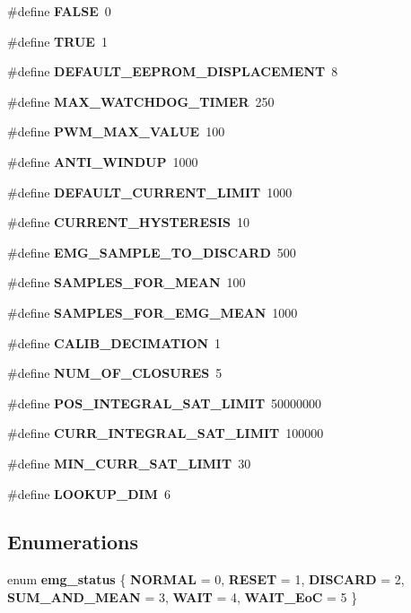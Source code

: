 \begin{DoxyCompactItemize}
\item 
\mbox{\label{globals_8h_aa93f0eb578d23995850d61f7d61c55c1}} 
\#define {\bfseries F\+A\+L\+SE}~0
\item 
\mbox{\label{globals_8h_aa8cecfc5c5c054d2875c03e77b7be15d}} 
\#define {\bfseries T\+R\+UE}~1
\item 
\#define \textbf{ D\+E\+F\+A\+U\+L\+T\+\_\+\+E\+E\+P\+R\+O\+M\+\_\+\+D\+I\+S\+P\+L\+A\+C\+E\+M\+E\+NT}~8
\item 
\#define \textbf{ M\+A\+X\+\_\+\+W\+A\+T\+C\+H\+D\+O\+G\+\_\+\+T\+I\+M\+ER}~250
\item 
\#define \textbf{ P\+W\+M\+\_\+\+M\+A\+X\+\_\+\+V\+A\+L\+UE}~100
\item 
\#define \textbf{ A\+N\+T\+I\+\_\+\+W\+I\+N\+D\+UP}~1000
\item 
\#define \textbf{ D\+E\+F\+A\+U\+L\+T\+\_\+\+C\+U\+R\+R\+E\+N\+T\+\_\+\+L\+I\+M\+IT}~1000
\item 
\#define \textbf{ C\+U\+R\+R\+E\+N\+T\+\_\+\+H\+Y\+S\+T\+E\+R\+E\+S\+IS}~10
\item 
\#define \textbf{ E\+M\+G\+\_\+\+S\+A\+M\+P\+L\+E\+\_\+\+T\+O\+\_\+\+D\+I\+S\+C\+A\+RD}~500
\item 
\#define \textbf{ S\+A\+M\+P\+L\+E\+S\+\_\+\+F\+O\+R\+\_\+\+M\+E\+AN}~100
\item 
\#define \textbf{ S\+A\+M\+P\+L\+E\+S\+\_\+\+F\+O\+R\+\_\+\+E\+M\+G\+\_\+\+M\+E\+AN}~1000
\item 
\mbox{\label{globals_8h_a373fe6bcff3bcd2f3c47359f9e640bf5}} 
\#define {\bfseries C\+A\+L\+I\+B\+\_\+\+D\+E\+C\+I\+M\+A\+T\+I\+ON}~1
\item 
\mbox{\label{globals_8h_a3132fbe7ff2f1850f96481fca447326a}} 
\#define {\bfseries N\+U\+M\+\_\+\+O\+F\+\_\+\+C\+L\+O\+S\+U\+R\+ES}~5
\item 
\#define \textbf{ P\+O\+S\+\_\+\+I\+N\+T\+E\+G\+R\+A\+L\+\_\+\+S\+A\+T\+\_\+\+L\+I\+M\+IT}~50000000
\item 
\#define \textbf{ C\+U\+R\+R\+\_\+\+I\+N\+T\+E\+G\+R\+A\+L\+\_\+\+S\+A\+T\+\_\+\+L\+I\+M\+IT}~100000
\item 
\mbox{\label{globals_8h_a071576950e29c654790153cad12794cb}} 
\#define {\bfseries M\+I\+N\+\_\+\+C\+U\+R\+R\+\_\+\+S\+A\+T\+\_\+\+L\+I\+M\+IT}~30
\item 
\#define \textbf{ L\+O\+O\+K\+U\+P\+\_\+\+D\+IM}~6
\end{DoxyCompactItemize}
\subsection*{Enumerations}
\begin{DoxyCompactItemize}
\item 
enum \textbf{ emg\+\_\+status} \{ \newline
\textbf{ N\+O\+R\+M\+AL} = 0, 
\textbf{ R\+E\+S\+ET} = 1, 
\textbf{ D\+I\+S\+C\+A\+RD} = 2, 
\textbf{ S\+U\+M\+\_\+\+A\+N\+D\+\_\+\+M\+E\+AN} = 3, 
\newline
\textbf{ W\+A\+IT} = 4, 
\textbf{ W\+A\+I\+T\+\_\+\+EoC} = 5
 \}
\end{DoxyCompactItemize}

